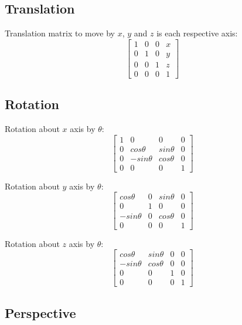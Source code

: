 \documentclass[a4paper]{article}
\begin{document}
\subsection{Translation}

Translation matrix to move by $x$, $y$ and $z$ is each respective axis:
\[
  \left [
    \begin{array}{cccc}
      1 & 0 & 0 & x \\
      0 & 1 & 0 & y \\
      0 & 0 & 1 & z \\
      0 & 0 & 0 & 1
    \end{array}
  \right ]
\]

\subsection{Rotation}

Rotation about $x$ axis by $\theta$:
\[
  \left [
    \begin{array}{cccc}
      1 & 0           & 0         & 0 \\
      0 & cos\theta   & sin\theta & 0 \\
      0 & -sin\theta  & cos\theta & 0 \\
      0 & 0           & 0         & 1
    \end{array}
  \right ]
\]

Rotation about $y$ axis by $\theta$:
\[
  \left [
    \begin{array}{cccc}
      cos\theta   & 0 & sin\theta & 0 \\
      0           & 1 & 0         & 0 \\
      -sin\theta  & 0 & cos\theta & 0 \\
      0           & 0 & 0         & 1
    \end{array}
  \right ]
\]

Rotation about $z$ axis by $\theta$:
\[
  \left [
    \begin{array}{cccc}
      cos\theta   & sin\theta & 0 & 0 \\
      -sin\theta  & cos\theta & 0 & 0 \\
      0           & 0         & 1 & 0 \\
      0           & 0         & 0 & 1
    \end{array}
  \right ]
\]

\subsection{Perspective}
\end{document}
